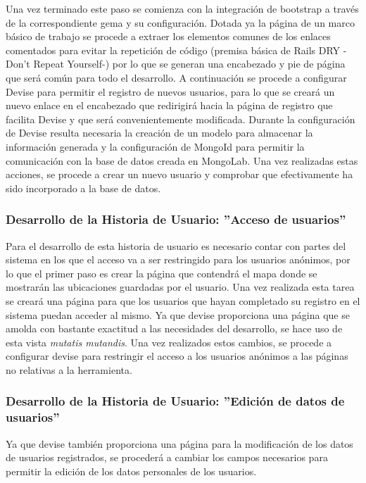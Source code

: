 	Una vez terminado este paso se comienza con la integración de bootstrap a través de la correspondiente gema y su configuración. Dotada ya la página de un marco básico de trabajo se procede a extraer los elementos comunes de los enlaces comentados para evitar la repetición de código (premisa básica de Rails DRY -Don't Repeat Yourself-) por lo que se generan una encabezado y pie de página que será común para todo el desarrollo.
	A continuación se procede a configurar Devise para permitir el registro de nuevos usuarios, para lo que se creará un nuevo enlace en el encabezado que redirigirá hacia la página de registro que facilita Devise y que será convenientemente modificada.
	Durante la configuración de Devise resulta necesaria la creación de un modelo para almacenar la información generada y la configuración de MongoId para permitir la comunicación con la base de datos creada en MongoLab.
	Una vez realizadas estas acciones, se procede a crear un nuevo usuario y comprobar que efectivamente ha sido incorporado a la base de datos.
	
	\subsubsection{Desarrollo de la Historia de Usuario: ''Acceso de usuarios'' }
	Para el desarrollo de esta historia de usuario es necesario contar con partes del sistema en los que el acceso va a ser restringido para los usuarios anónimos, por lo que el primer paso es crear la página que contendrá el mapa donde se mostrarán las ubicaciones guardadas por el usuario.
	Una vez realizada esta tarea se creará una página para que los usuarios que hayan completado su registro en el sistema puedan acceder al mismo. Ya que devise proporciona una página que se amolda con bastante exactitud a las necesidades del desarrollo, se hace uso de esta vista \textit{mutatis mutandis}.
	Una vez realizados estos cambios, se procede a configurar devise para restringir el acceso a los usuarios anónimos a las páginas no relativas a la herramienta.
	
	\subsubsection{Desarrollo de la Historia de Usuario: ''Edición de datos de usuarios'' }
	Ya que devise también proporciona una página para la modificación de los datos de usuarios registrados, se procederá a cambiar los campos necesarios para permitir la edición de los datos personales de los usuarios.
	
